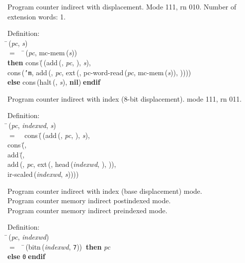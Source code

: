  Program counter indirect with displacement.  Mode 111, rn 010.
 Number of extension words: 1.
\begin{tabbing}{\sc Definition}: \\  
\=\,({\it{pc\/}}, {\it{s\/}}) \\ 
$=$$\;\;\;\;$\=\,({\it{pc\/}}, {\rm{mc-mem}}\,({\it{s\/}})) \\ 
{\bf then }{\rm{cons}}\,(\=\,({\rm{add}}\,({}, {\it{pc\/}}, {}), {\it{s\/}}), \\ 
{\rm{cons}}\,({\tt{'}}{\tt{m}}, {\rm{add}}\,({}, {\it{pc\/}}, {\rm{ext}}\,({}, {\rm{pc-word-read}}\,({\it{pc\/}}, {\rm{mc-mem}}\,({\it{s\/}})), {}))))\- \\ 
{\bf else }{\rm{cons}}\,({\rm{halt}}\,({}, {\it{s\/}}), {\bf{nil}})$\;${\bf  endif}\-\-
\end{tabbing}

 Program counter indirect with index (8-bit displacement). mode 111, rn 011.
\begin{tabbing}{\sc Definition}: \\  
\=\,({\it{pc\/}}, {\it{indexwd\/}}, {\it{s\/}}) \\ 
$=$$\;\;\;\;${\rm{cons}}\,(\=\,({\rm{add}}\,({}, {\it{pc\/}}, {}), {\it{s\/}}), \\ 
{\rm{cons}}\,(\=, \\ 
{\rm{add}}\,(\=, \\ 
{\rm{add}}\,({}, {\it{pc\/}}, {\rm{ext}}\,({}, {\rm{head}}\,({\it{indexwd\/}}, {}), {})), \\ 
{\rm{ir-scaled}}\,({\it{indexwd\/}}, {\it{s\/}}))\-)\-)\-\-
\end{tabbing}

 \noindent Program counter indirect with index (base displacement) mode. \\
 Program counter memory indirect postindexed mode. \\
 Program counter memory indirect preindexed mode.
\begin{tabbing}{\sc Definition}: \\  
\=\,({\it{pc\/}}, {\it{indexwd\/}}) \\ 
$=$$\;\;\;\;$\=\,({\rm{bitn}}\,({\it{indexwd\/}}, {\tt{7}}))$\;\;${\bf then }{\it{pc\/}} \\ 
{\bf else }{\tt{0}}$\;${\bf  endif}\-\-
\end{tabbing}
 
